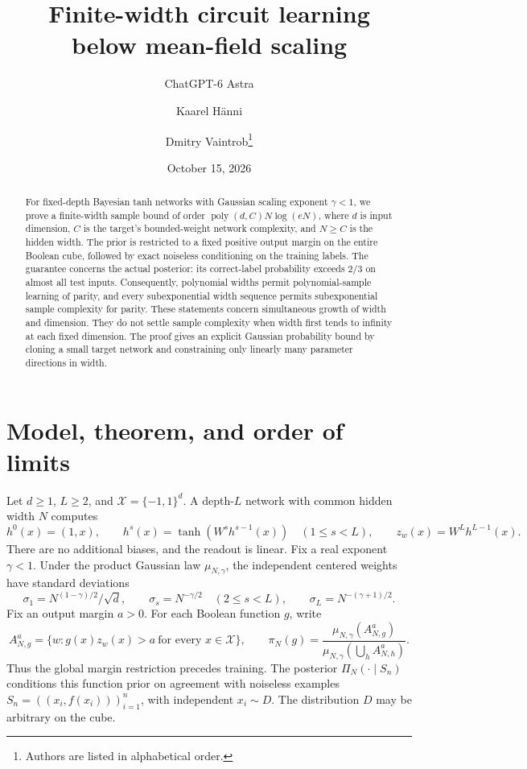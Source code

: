 \documentclass[11pt]{article}
\title{Finite-width circuit learning\\below mean-field scaling}
\author{ChatGPT-6 Astra \and Kaarel H\"anni \and Dmitry Vaintrob\thanks{Authors are listed in alphabetical order.}}
\date{October 15, 2026}
\theoremstyle{remark}\newtheorem{remark}[theorem]{Remark}
\begin{document}
\maketitle
\begin{abstract}
For fixed-depth Bayesian tanh networks with Gaussian scaling exponent
$\gamma<1$, we prove a finite-width sample bound of order
$\operatorname{poly}(d,C)N\log(eN)$, where $d$ is input dimension,
$C$ is the target's bounded-weight network complexity, and $N\ge C$
is the hidden width. The prior is restricted to a fixed positive output
margin on the entire Boolean cube, followed by exact noiseless conditioning
on the training labels. The guarantee concerns the actual posterior:
its correct-label probability exceeds $2/3$ on almost all test inputs.
Consequently, polynomial widths permit polynomial-sample learning of
parity, and every subexponential width sequence permits subexponential
sample complexity for parity. These statements concern simultaneous growth of width
and dimension. They do not settle sample complexity when width first tends
to infinity at each fixed dimension. The proof gives an explicit Gaussian
probability bound by cloning a small target network and constraining only
linearly many parameter directions in width.
\end{abstract}

\section{Model, theorem, and order of limits}
Let $d\ge1$, $L\ge2$, and $\mathcal X=\{-1,1\}^d$.
A depth-$L$ network with common hidden width $N$ computes
\[
 h^0(x)=(1,x),\qquad
 h^s(x)=\tanh(W^sh^{s-1}(x))\quad(1\le s<L),
 \qquad z_w(x)=W^Lh^{L-1}(x).
\]
There are no additional biases, and the readout is linear. Fix a real
exponent $\gamma<1$. Under the product Gaussian law $\mu_{N,\gamma}$,
the independent centered weights have standard deviations
\begin{equation}\label{eq:scaling}
 \sigma_1=N^{(1-\gamma)/2}/\sqrt d,
 \qquad \sigma_s=N^{-\gamma/2}\quad(2\le s<L),
 \qquad \sigma_L=N^{-(\gamma+1)/2}.
\end{equation}
Fix an output margin $a>0$. For each Boolean function $g$, write
\[
 A_{N,g}^a=\{w:g(x)z_w(x)>a\ \text{for every }x\in\mathcal X\},
 \qquad
 \pi_N(g)=\frac{\mu_{N,\gamma}(A_{N,g}^a)}
 {\mu_{N,\gamma}(\bigcup_h A_{N,h}^a)}.
\]
Thus the global margin restriction precedes training. The posterior
$\Pi_N(\cdot\mid S_n)$ conditions this function prior on agreement with
noiseless examples $S_n=((x_i,f(x_i)))_{i=1}^n$, with independent $x_i\sim D$.
The distribution $D$ may be arbitrary on the cube.
\end{document}
